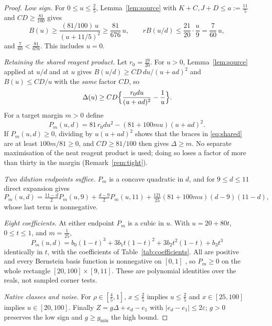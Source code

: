 \documentclass[11pt]{article}
\theoremstyle{plain}
\theoremstyle{definition}
\numberwithin{equation}{section}
\newcommand{\eps}{\varepsilon}
\newcommand{\gmin}{g_{\min}}
\begin{document}
\begin{proof}
\emph{Low sign.} For $0\le u\le\frac25$, Lemma~\ref{lem:source} with $K+C,J+D\le a:=\frac{11}5$
and $CD\ge\frac{81}{100}$ gives
\[
 B(u)\ge\frac{(81/100)\,u}{(u+11/5)^2}\ge\frac{81}{676}\,u,\qquad
 rB(u/d)\le\frac{21}{20}\cdot\frac u9=\frac7{60}\,u ,
\]
and $\frac7{60}<\frac{81}{676}$. This includes $u=0$.

\emph{Retaining the shared reagent product.} Let $r_0=\frac{19}{20}$. For $u>0$,
Lemma~\ref{lem:source} applied at $u/d$ and at $u$ gives
$B(u/d)\ge CD\,du/(u+ad)^2$ and $B(u)\le CD/u$ with the \emph{same} factor $CD$, so
\begin{equation}\label{eq:shared}
 \Delta(u)\ge CD\Bigl\{\frac{r_0du}{(u+ad)^2}-\frac1u\Bigr\}.
\end{equation}
For a target margin $m>0$ define
\begin{equation}\label{eq:poly}
 P_m(u,d)=81\,r_0du^2-(81+100mu)(u+ad)^2 .
\end{equation}
If $P_m(u,d)\ge0$, dividing by $u(u+ad)^2$ shows that the braces in
\eqref{eq:shared} are at least $100m/81\ge0$, and $CD\ge81/100$ then gives
$\Delta\ge m$. No separate maximisation of the neat reagent product is used; doing
so loses a factor of more than thirty in the margin (Remark~\ref{rem:tight}).

\emph{Two dilution endpoints suffice.} $P_m$ is a concave quadratic in $d$, and for
$9\le d\le11$ direct expansion gives
\begin{equation}\label{eq:interp}
 P_m(u,d)=\tfrac{11-d}{2}P_m(u,9)+\tfrac{d-9}{2}P_m(u,11)
 +\tfrac{121}{25}(81+100mu)(d-9)(11-d),
\end{equation}
whose last term is nonnegative.

\emph{Eight coefficients.} At either endpoint $P_m$ is a cubic in $u$. With
$u=20+80t$, $0\le t\le1$, and $m=\frac1{25}$,
\begin{equation}\label{eq:bern}
 P_m(u,d)=b_0(1-t)^3+3b_1t(1-t)^2+3b_2t^2(1-t)+b_3t^3
\end{equation}
identically in $t$, with the coefficients of Table~\ref{tab:coefficients}. All are
positive and every Bernstein basis function is nonnegative on $[0,1]$
\cite{farouki2012,garloff1993}, so $P_m\ge0$ on the whole rectangle
$[20,100]\times[9,11]$. These are polynomial identities over the reals, not sampled
corner tests.

\emph{Native classes and noise.} For $\rho\in[\frac45,1]$, $x\le\frac25$ implies
$u\le\frac25$ and $x\in[25,100]$ implies $u\in[20,100]$. Finally
$Z=g\Delta+e_d-e_1$ with $|e_d-e_1|\le2\eps$; $g>0$ preserves the low sign and
$g\ge\gmin$ the high bound.
\end{proof}
\end{document}
